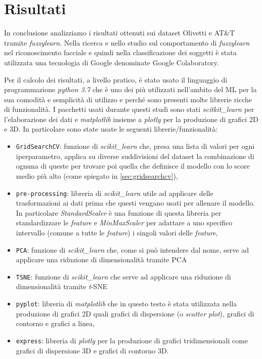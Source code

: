 \documentclass[12pt,italian]{report}
\begin{document}

\section{Risultati}
In conclusione analizziamo i risultati ottenuti sui dataset Olivetti e AT\&T tramite \emph{fuzzylearn}. Nella ricerca e nello studio sul comportamento di \emph{fuzzylearn} nel riconoscimento facciale e quindi nella classificazione dei soggetti è stata utilizzata una tecnologia di Google denominate Google Colaboratory.

Per il calcolo dei risultati, a livello pratico, è stato usato il linguaggio di programmazione \emph{python 3.7} che è uno dei più utilizzati nell'ambito del ML per la sua comodità e semplicità di utilizzo e perché sono presenti molte librerie ricche di funzionalità. I pacchetti usati durante questi studi sono stati \emph{scitkit\_learn} per l'elaborazione dei dati e \emph{matplotlib} insieme a \emph{plotly} per la produzione di grafici 2D e 3D. In particolare sono state usate le seguenti librerie/funzionalità:
\begin{itemize}
	\item{\texttt{GridSearchCV}: funzione di \emph{scikit\_learn} che, presa una lista di valori per ogni iperparametro, applica su diverse suddivisioni del dataset la combinazione di ognuna di queste per trovare poi quella che definisce il modello con lo score medio più alto (come spiegato in \ref{sec:gridsearchcv}),}
	\item{\texttt{pre-processing}: libreria di \emph{scikit\_learn} utile ad applicare delle trasformazioni ai dati prima che questi vengano usati per allenare il modello. In particolare \emph{StandardScaler} è una funzione di questa libreria per standardizzare le \emph{feature} e \emph{MinMaxScaler} per adattare a uno specifico intervallo (comune a tutte le \emph{feature}) i singoli valori delle \emph{feature},}
	\item{\texttt{PCA}: funzione di \emph{scikit\_learn} che, come si può intendere dal nome, serve ad applicare una riduzione di dimensionalità tramite PCA}
	\item{\texttt{TSNE}: funzione di \emph{scikit\_learn} che serve ad applicare una riduzione di dimensionalità tramite \emph{t}-SNE}
\item{\texttt{pyplot}: libreria di \emph{matplotlib} che in questo testo è stata utilizzata nella produzione di grafici 2D quali grafici di dispersione (o \emph{scatter plot}), grafici di contorno e grafici a linea,}
\item{\texttt{express}: libreria di \emph{plotly} per la produzione di grafici tridimensionali come grafici di dispersione 3D e grafici di contorno 3D.}
\end{itemize}
\end{document}
